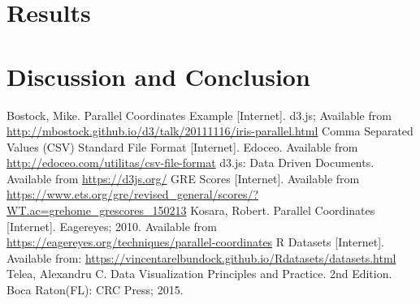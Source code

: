 \documentclass[]{article}
\begin{document}
\section{Results}

\section{Discussion and Conclusion}

\begin{thebibliography}{11}
		Bostock, Mike. Parallel Coordinates Example [Internet]. d3.js; Available from \url{http://mbostock.github.io/d3/talk/20111116/iris-parallel.html}
		Comma Separated Values (CSV) Standard File Format [Internet]. Edoceo. Available from \url{http://edoceo.com/utilitas/csv-file-format}
		d3.js: Data Driven Documents. Available from \url{https://d3js.org/}
		GRE Scores [Internet]. Available from \url{https://www.ets.org/gre/revised_general/scores/?WT.ac=grehome_grescores_150213}
		Kosara, Robert. Parallel Coordinates [Internet]. Eagereyes; 2010. Available from \url{https://eagereyes.org/techniques/parallel-coordinates}
		R Datasets [Internet]. Available from: \url{https://vincentarelbundock.github.io/Rdatasets/datasets.html}
		Telea, Alexandru C. Data Visualization Principles and Practice. 2nd Edition. Boca Raton(FL): CRC Press; 2015.


\end{thebibliography}
\end{document}
